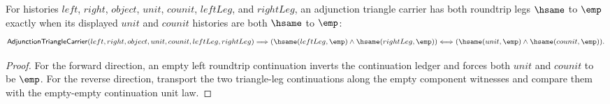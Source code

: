 \begin{theorem}
\label{thm:adjunction-triangle-roundtrip-empty-iff-components-empty}
For histories $left$, $right$, $object$, $unit$, $counit$, $leftLeg$, and
$rightLeg$, an adjunction triangle carrier has both roundtrip legs $\hsame$ to
$\emp$ exactly when its displayed $unit$ and $counit$ histories are both
$\hsame$ to $\emp$:
$$
\mathsf{AdjunctionTriangleCarrier}(left,right,object,unit,counit,leftLeg,rightLeg)
\Longrightarrow
(\hsame(leftLeg,\emp)\land\hsame(rightLeg,\emp))
\Longleftrightarrow
(\hsame(unit,\emp)\land\hsame(counit,\emp)).
$$
\end{theorem}
\begin{proof}
For the forward direction, an empty left roundtrip continuation inverts the
continuation ledger and forces both $unit$ and $counit$ to be $\emp$. For the
reverse direction, transport the two triangle-leg continuations along the
empty component witnesses and compare them with the empty-empty continuation
unit law.
\end{proof}

